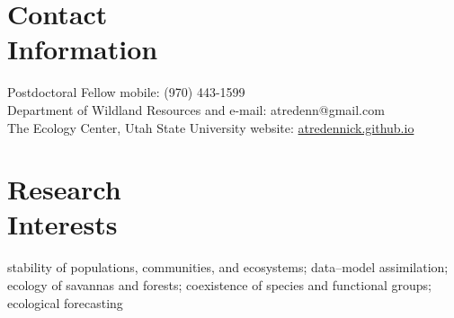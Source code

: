 \documentclass[margin,line]{resume}
\begin{document}
\begin{resume}

    \section{\mysidestyle Contact\\Information}

    Postdoctoral Fellow      							 \hfill mobile: (970) 443-1599            \vspace{0mm}\\\vspace{0mm}%
    Department of Wildland Resources and    		          \hfill e-mail: atredenn@gmail.com    \vspace{0mm}\\\vspace{0mm}%
    The Ecology Center, Utah State University      	          \hfill website: \href{http://atredennick.github.io}{atredennick.github.io}  \vspace{0mm}\\\vspace{-4.5mm}%

    \section{\mysidestyle Research\\Interests}
		stability of populations, communities, and ecosystems; data--model assimilation; ecology of savannas and forests; coexistence of species and functional groups; ecological forecasting %

\end{resume}
\end{document}
